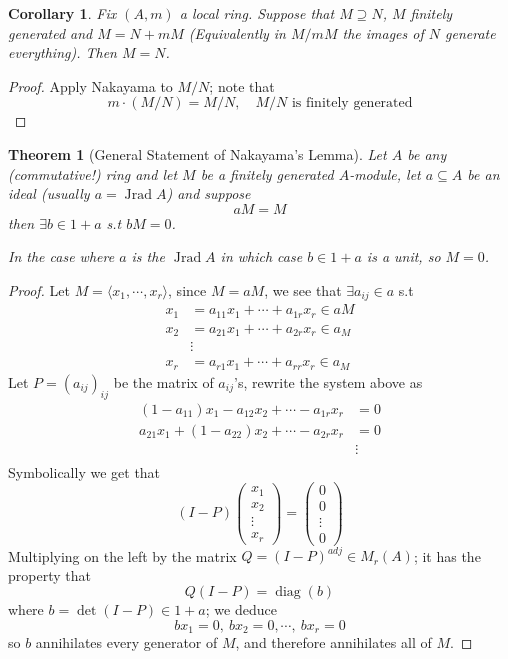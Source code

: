 \documentclass[11pt,a4paper]{article}
\theoremstyle{definition}
\theoremstyle{plain}
\newtheorem{theorem}[definition]{Theorem}
\newtheorem{corollary}[definition]{Corollary}
\theoremstyle{remark}
\newcommand{\angles}[1]{\langle #1 \rangle}
\begin{document}
\begin{corollary}
    Fix $(A, m)$ a local ring. Suppose that $M \supseteq N$, $M$ finitely generated and $M = N + m M$ (Equivalently in $M / m M$ the images of $N$ generate everything). 
    Then $M = N$. 
\end{corollary}

\begin{proof}
    Apply Nakayama to $M / N$; note that 
    $$m \cdot (M/N) = M/N, \quad M/N \text{ is finitely generated}$$
\end{proof}

\begin{theorem}[General Statement of Nakayama's Lemma]
    Let $A$ be any (commutative!) ring and let $M$ be a finitely generated $A$-module, let $a \subseteq A$ be an ideal (usually $a = \operatorname{Jrad} A$) and suppose 
    $$a M = M$$
    then $\exists b \in 1 + a$ s.t $b M = 0$. 

    In the case where $a$ is the $\operatorname{Jrad} A$ in which case $b \in 1 + a$ is a unit, so $M = 0$. 
\end{theorem}

\begin{proof}
    Let $M = \angles{x_1, \cdots, x_r}$, since $M = aM$, we see that $\exists a_{ij} \in a$ s.t 
    \begin{align*}
        x_1 &= a_{11} x_1 + \cdots + a_{1r} x_r \in a M \\
        x_2 &= a_{21} x_1 + \cdots + a_{2r} x_r \in a_M \\
        &\vdots \\
        x_r &= a_{r1} x_1 + \cdots + a_{rr} x_r\in a_M
    \end{align*}
    Let $P = (a_{ij})_{ij}$ be the matrix of $a_{ij}$'s, rewrite the system above as 
    \begin{align*}
        (1 - a_{11}) x_1 - a_{12} x_2 + \cdots - a_{1r} x_r &= 0 \\
        a_{21} x_1 + (1 - a_{22}) x_2 + \cdots - a_{2r} x_r &= 0 \\
        &\vdots \\
    \end{align*}
    Symbolically we get that 
    $$(I - P) \begin{pmatrix}
        x_1 \\ x_2 \\ \vdots \\ x_r
    \end{pmatrix} = \begin{pmatrix}
        0 \\ 0 \\ \vdots \\0
    \end{pmatrix}$$
    Multiplying on the left by the matrix $Q = (I - P)^{adj} \in M_r(A)$; it has the property that 
    $$Q (I-P) = \operatorname{diag} (b)$$
    where $b = \operatorname{det} (I - P) \in 1 + a$; we deduce 
    $$b x_1 = 0, \ b x_2 = 0, \cdots, \ b x_r = 0$$
    so $b$ annihilates every generator of $M$, and therefore annihilates all of $M$. 
\end{proof}
\end{document}
